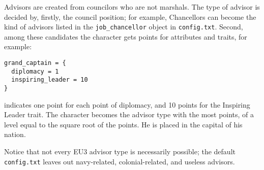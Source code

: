 \documentclass[12pt,ebook,oneside]{book}
\begin{document}
Advisors are created from councilors who are not marshals. The type of
advisor is decided by, firstly, the council position; for example,
Chancellors can become the kind of advisors listed in the
\verb|job_chancellor| object in \verb|config.txt|. Second, among these
candidates the character gets points for attributes and traits, for
example:
\begin{verbatim}
grand_captain = {
  diplomacy = 1
  inspiring_leader = 10
} 
\end{verbatim}
indicates one point for each point of diplomacy, and 10 points for the
Inspiring Leader trait. The character becomes the advisor type with
the most points, of a level equal to the square root of the points. 
He is placed in the capital of his nation. 

Notice that not every EU3 advisor type is necessarily possible; the
default \verb|config.txt| leaves out navy-related, colonial-related,
and useless advisors. 
\end{document}
